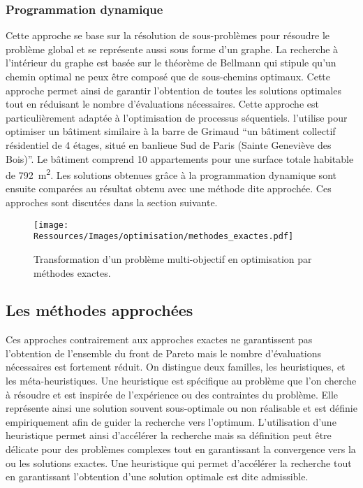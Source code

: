 \subsubsection{Programmation dynamique} %
\label{ssub:programmation_dynamique}
Cette approche se base sur la résolution de sous-problèmes pour résoudre le
problème global et se représente aussi sous forme d’un graphe. La recherche à
l’intérieur du graphe est basée sur le théorème de Bellmann qui stipule qu’un
chemin optimal ne peux être composé que de sous-chemins optimaux. Cette approche
permet ainsi de garantir l’obtention de toutes les solutions optimales tout en
réduisant le nombre d’évaluations nécessaires. Cette approche est
particulièrement adaptée à l’optimisation de processus séquentiels.
\textcite{Rivallain2013} l’utilise pour optimiser un bâtiment similaire à la
barre de Grimaud \enquote{un bâtiment collectif résidentiel de 4 étages, situé en banlieue Sud
de Paris (Sainte Geneviève des Bois)}. Le bâtiment comprend 10 appartements pour
une surface totale habitable de \SI{792}{\meter\squared}. Les solutions obtenues
grâce à la programmation dynamique sont ensuite comparées au résultat obtenu avec
une méthode dite approchée. Ces approches sont discutées dans la section suivante.

\begin{figure}
    \begin{center}
        \texttt{[image: Ressources/Images/optimisation/methodes\_exactes.pdf]}
    \end{center}
    \caption{Transformation d’un problème multi-objectif en optimisation par méthodes
             exactes.
             \label{fig:multi_exactes}}
\end{figure}



\subsection{Les méthodes approchées} %
\label{sub:les_methodes_approchees}
Ces approches contrairement aux approches exactes ne garantissent pas
l’obtention de l’ensemble du front de Pareto mais le nombre d’évaluations
nécessaires est fortement réduit. On distingue deux familles, les heuristiques,
et les méta-heuristiques. Une heuristique est spécifique au problème que l’on
cherche à résoudre et est inspirée de l’expérience ou des contraintes du
problème. Elle représente ainsi une solution souvent sous-optimale ou non
réalisable et est définie empiriquement afin de guider la recherche vers
l’optimum. L’utilisation d’une heuristique permet ainsi d’accélérer la recherche
mais sa définition peut être délicate pour des problèmes complexes tout en
garantissant la convergence vers la ou les solutions exactes. Une heuristique
qui permet d’accélérer la recherche tout en garantissant l’obtention d’une
solution optimale est dite admissible.

